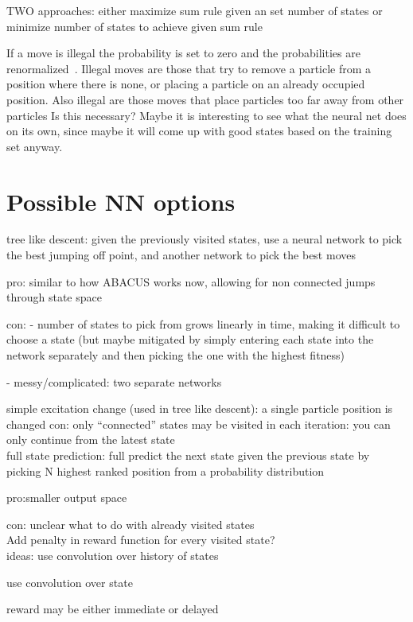 \documentclass[11pt, a4paper]{report} %
\begin{document}
TWO approaches: either maximize sum rule given an set number of states or minimize number of states to achieve given sum rule


If a move is illegal the probability is set to zero and the probabilities are renormalized~\cite{pmlr-v37-clark15}.
Illegal moves are those that try to remove a particle from a position where there is none, or placing a particle on an already occupied position.
Also illegal are those moves that place particles too far away from other particles Is this necessary? Maybe it is interesting to see what the neural net does on its own, since maybe it will come up with good states based on the training set anyway.



\section{Possible NN options}

tree like descent: given the previously visited states, use a neural network to pick the best jumping off point, and another network to pick the best moves

pro: similar to how ABACUS works now, allowing for non connected jumps through state space

con: - number of states to pick from grows linearly in time, making it difficult to choose a state (but maybe mitigated by simply entering each state into the network separately and then picking the one with the highest fitness)

- messy/complicated: two separate networks

simple excitation change (used in tree like descent): a single particle position is changed
con: only ``connected'' states may be visited in each iteration: you can only continue from the latest state
\\
full state prediction: full predict the next state given the previous state by picking N highest ranked position from a probability distribution

pro:smaller output space

con: unclear what to do with already visited states
\\
Add penalty in reward function for every visited state?
\\
ideas:
use convolution over history of states

use convolution over state

reward may be either immediate or delayed
\end{document}
